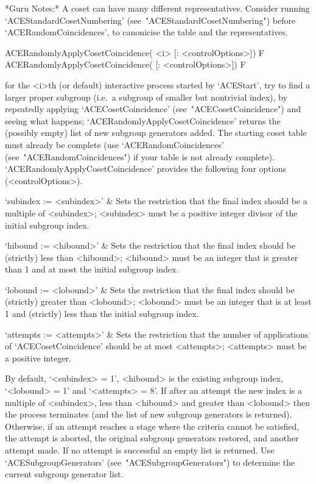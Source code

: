*Guru  Notes:*  A  coset  can  have  many  different  representatives.
Consider              running              `ACEStandardCosetNumbering'
(see~"ACEStandardCosetNumbering") before  `ACERandomCoincidences',  to
canonicise the table and the representatives.

\>ACERandomlyApplyCosetCoincidence( <i> [: <controlOptions>]) F
\>ACERandomlyApplyCosetCoincidence( [: <controlOptions>]) F

for the <i>th (or  default)  interactive  {\ACE}  process  started  by
`ACEStart', try to find a larger proper subgroup (i.e.~a  subgroup  of
smaller   but    nontrivial    index),    by    repeatedly    applying
`ACECosetCoincidence'  (see~"ACECosetCoincidence")  and  seeing   what
happens;  `ACERandomlyApplyCosetCoincidence'  returns  the   (possibly
empty) list of new subgroup generators added. The starting coset table
must    already    be    complete     (use     `ACERandomCoincidences'
(see~"ACERandomCoincidences") if your table is not already  complete).
`ACERandomlyApplyCosetCoincidence' provides the following four options
(<controlOptions>).

\beginitems

\quad`subindex := <subindex>' & 
Sets the restriction that the final index  should  be  a  multiple  of
<subindex>; <subindex> must be  a  positive  integer  divisor  of  the
initial subgroup index.

\quad`hibound := <hibound>' &
Sets the restriction that the final index should  be  (strictly)  less
than <hibound>; <hibound> must be an integer that is  greater  than  1
and at most the initial subgroup index.

\quad`lobound := <lobound>' &
Sets the restriction that the final index should be (strictly) greater
than <lobound>; <lobound> must be an integer that is at  least  1  and
(strictly) less than the initial subgroup index.

\quad`attempts := <attempts>' &
Sets  the   restriction   that   the   number   of   applications   of
`ACECosetCoincidence' should be at most <attempts>; <attempts> must be
a positive integer.

\enditems

By default, `<subindex> =  1',  <hibound>  is  the  existing  subgroup
index, `<lobound> = 1' and `<attempts> = 8'. If after an  attempt  the
new index is a multiple of <subindex>, less than <hibound> and greater
than <lobound> then the  process  terminates  (and  the  list  of  new
subgroup generators is returned). Otherwise, if an attempt  reaches  a
stage where the criteria cannot be satisfied, the attempt is  aborted,
the original subgroup generators restored, and another  attempt  made.
If  no  attempt  is  successful  an  empty  list  is   returned.   Use
`ACESubgroupGenerators' (see~"ACESubgroupGenerators") to determine the
current subgroup generator list.

